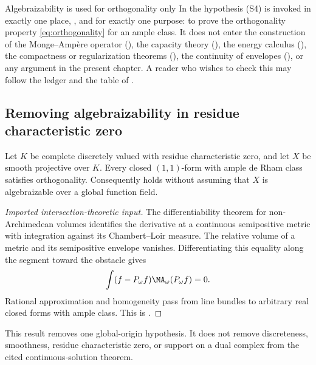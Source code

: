 \begin{warning}{Algebraizability is used for orthogonality only}
\label{warn:ch29-algebraizability-scope}
In \cite{BFJ15} the hypothesis \textup{(S4)} is invoked in exactly one
place, \cite[Appendix~A]{BFJ15}, and for exactly one purpose: to prove the
orthogonality property \eqref{eq:orthogonality} for an ample class.  It does
not enter the construction of the Monge--Amp\`ere operator
(), the capacity theory (), the
energy calculus (), the compactness or regularization
theorems (), the continuity of envelopes
(), or any argument in the present chapter.  A
reader who wishes to check this may follow the ledger
 and the table of
.
\end{warning}

\subsection{Removing algebraizability in residue characteristic zero}
\label{sec:ch29-remove-algebraizability}

\begin{theorem}\label{thm:bggjkm-remove-algebraizability}
Let \(K\) be complete discretely valued with residue characteristic zero,
and let \(X\) be smooth projective over \(K\).  Every closed \((1,1)\)-form
with ample de Rham class satisfies orthogonality.  Consequently
 holds without assuming
that \(X\) is algebraizable over a global function field.
\end{theorem}

\begin{proof}[Imported intersection-theoretic input]
The differentiability theorem for non-Archimedean volumes identifies the
derivative at a continuous semipositive metric with integration against its
Chambert--Loir measure.  The relative volume of a metric and its semipositive
envelope vanishes.  Differentiating this equality along the segment toward
the obstacle gives
\[
 \int(f-P_\omega f)\MA_\omega(P_\omega f)=0.
\]
Rational approximation and homogeneity pass from line bundles to arbitrary
real closed forms with ample class.  This is
\cite[Theorem~6.3.3 and Corollary~6.3.4]{BGGJKM20}.
\end{proof}

This result removes one global-origin hypothesis.  It does not remove
discreteness, smoothness, residue characteristic zero, or support on a dual
complex from the cited continuous-solution theorem.

